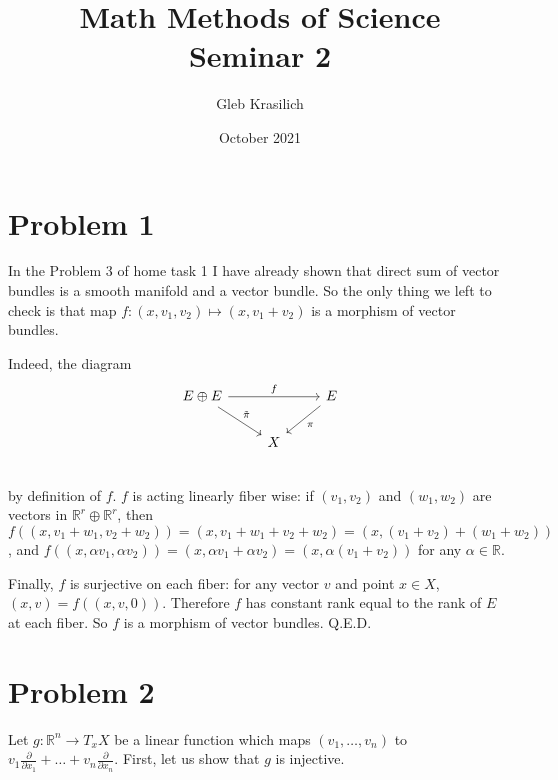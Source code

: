 \documentclass{article}[14pt]
\title{Math Methods of Science \\
Seminar 2}
\author{Gleb Krasilich}
\date{October 2021}
\begin{document}
\maketitle

\section{Problem 1}

In the Problem 3 of home task 1 I have already shown that direct sum of vector bundles is a smooth manifold and a vector bundle.
So the only thing we left to check is that map $f: (x, v_1, v_2) \mapsto (x, v_1 + v_2)$ is a morphism of vector bundles.\

Indeed, the diagram
\[
\begin{tikzcd}
    E \oplus E \arrow[rr, "f"] \arrow[rd, "\tilde{\pi}"] & &  \arrow[ld, "\pi"] E \\
    & X & \\
\end{tikzcd}
\]
by definition of $f$.
$f$ is acting linearly fiber wise: if $(v_1, v_2)$ and $(w_1, w_2)$ are vectors in 
$\mathbb R^r \oplus \mathbb R^r$, then $f((x, v_1 + w_1, v_2 + w_2)) = (x, v_1 + w_1 + v_2 + w_2) = (x, (v_1 + v_2) + (w_1 + w_2))$,
and $f((x, \alpha v_1, \alpha v_2)) = (x, \alpha v_1 + \alpha v_2) = (x, \alpha (v_1 + v_2))$ for any $\alpha \in \mathbb R$.

Finally, $f$ is surjective on each fiber: for any vector $v$ and point $x \in X$, $(x, v) = f((x, v, 0))$.
Therefore $f$ has constant rank equal to the rank of $E$ at each fiber.
So $f$ is a morphism of vector bundles. Q.E.D.

\section{Problem 2}

Let $g: \mathbb R^n \rightarrow T_x X$ be a linear function which maps $(v_1, \dots, v_n)$ to $v_1 \frac{\partial}{\partial x_1} + \dots + v_n \frac{\partial}{\partial x_n}$.
First, let us show that $g$ is injective. 
\end{document}

